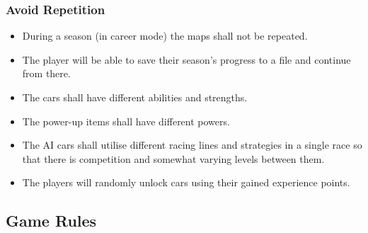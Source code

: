 \documentclass[12pt]{article}
\begin{document}
\subsubsection{Avoid Repetition}

\begin{itemize}
\item During a season (in career mode) the maps shall not be repeated.
\item The player will be able to save their season’s progress to a file and continue from there.
\item The cars shall have different abilities and strengths.
\item The power-up items shall have different powers.
\item The AI cars shall utilise different racing lines and strategies in a single race so that there is competition and somewhat varying levels between them.
\item The players will randomly unlock cars using their gained experience points.
\end{itemize}

\subsection{Game Rules}
\end{document}
